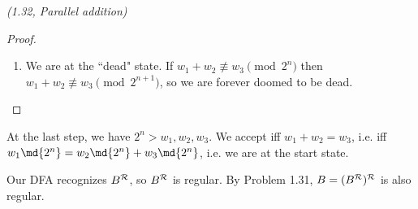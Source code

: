 \begin{problem}{\it (1.32, Parallel addition)}
\begin{proof}
\begin{enumerate}
\item
We are at the ``dead" state. If $w_1+w_2\nequiv w_3\pmod{2^n}$ then $w_1+w_2\nequiv w_3\pmod{2^{n+1}}$, so we are forever doomed to be dead.
\end{enumerate}
\end{proof}
At the last step, we have $2^n>w_1,w_2,w_3$. We accept iff $w_1+w_2=w_3$, i.e. iff $w_1\md{2^n}=w_2\md{2^n}+w_3\md{2^n}$, i.e. we are at the start state.

Our DFA recognizes $B^{\cal R}$, so $B^{\cal R}$ is regular. By Problem 1.31, $B=(B^{\cal R})^{\cal R}$ is also regular.
\end{problem}

\pagebreak

